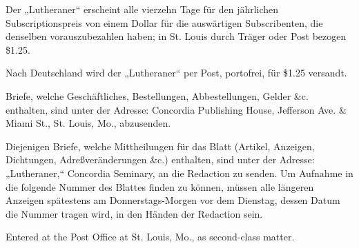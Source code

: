\trenner

Der „Lutheraner“ erscheint alle vierzehn Tage für den jährlichen Subscriptionspreis von einem Dollar für die auswärtigen Subscribenten, die denselben vorauszubezahlen haben; in St. Louis durch Träger oder Post bezogen \$1.25.

Nach Deutschland wird der „Lutheraner“ per Post, portofrei, für \$1.25 versandt.

Briefe, welche Geschäftliches, Bestellungen, Abbestellungen, Gelder \&c. enthalten, sind unter der Adresse: Concordia Publishing House, Jefferson Ave. \& Miami St., St. Louis, Mo., abzusenden.

Diejenigen Briefe, welche Mittheilungen für das Blatt (Artikel, Anzeigen, Dichtungen, Adreßveränderungen \&c.) enthalten, sind unter der Adresse: „Lutheraner,“ Concordia Seminary, an die Redaction zu senden. Um Aufnahme in die folgende Nummer des Blattes finden zu können, müssen alle längeren Anzeigen spätestens am Donnerstags-Morgen vor dem Dienstag, dessen Datum die Nummer tragen wird, in den Händen der Redaction sein.

Entered at the Post Office at St. Louis, Mo., as second-class matter.
